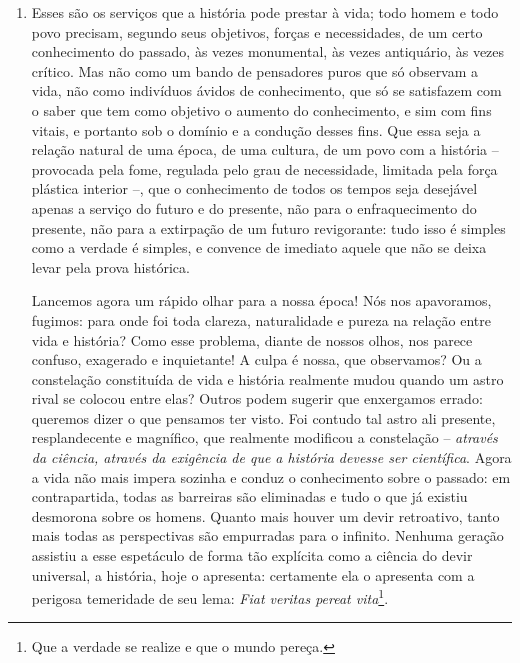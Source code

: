   \begin{enumerate}
  \item
    Esses são os serviços que a história pode prestar à vida; todo homem
    e todo povo precisam, segundo seus objetivos, forças e necessidades,
    de um certo conhecimento do passado, às vezes monumental, às vezes
    antiquário, às vezes crítico. Mas não como um bando de pensadores
    puros que só observam a vida, não como indivíduos ávidos de
    conhecimento, que só se satisfazem com o saber que tem como objetivo
    o aumento do conhecimento, e sim com fins vitais, e portanto sob o
    domínio e a condução desses fins. Que essa seja a relação natural de
    uma época, de uma cultura, de um povo com a história -- provocada
    pela fome, regulada pelo grau de necessidade, limitada pela força
    plástica interior --, que o conhecimento de todos os tempos seja
    desejável apenas a serviço do futuro e do presente, não para o
    enfraquecimento do presente, não para a extirpação de um futuro
    revigorante: tudo isso é simples como a verdade é simples, e
    convence de imediato aquele que não se deixa levar pela prova
    histórica.

    Lancemos agora um rápido olhar para a nossa época! Nós nos
    apavoramos, fugimos: para onde foi toda clareza, naturalidade e
    pureza na relação entre vida e história? Como esse problema, diante
    de nossos olhos, nos parece confuso, exagerado e inquietante! A
    culpa é nossa, que observamos? Ou a constelação constituída de vida
    e história realmente mudou quando um astro rival se colocou entre
    elas? Outros podem sugerir que enxergamos errado: queremos dizer o
    que pensamos ter visto. Foi contudo tal astro ali presente,
    resplandecente e magnífico, que realmente modificou a constelação --
    \emph{através da ciência, através da exigência de que a história
    devesse ser científica}. Agora a vida não mais impera sozinha e
    conduz o conhecimento sobre o passado: em contrapartida, todas as
    barreiras são eliminadas e tudo o que já existiu desmorona sobre os
    homens. Quanto mais houver um devir retroativo, tanto mais todas as
    perspectivas são empurradas para o infinito. Nenhuma geração
    assistiu a esse espetáculo de forma tão explícita como a ciência do
    devir universal, a história, hoje o apresenta: certamente ela o
    apresenta com a perigosa temeridade de seu lema: \emph{Fiat veritas
    pereat vita}\footnote{Que a verdade se realize e que o mundo pereça.}.


\end{enumerate}
